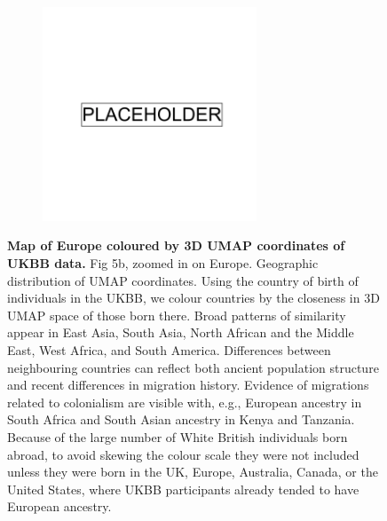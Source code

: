 \begin{figure}[ht]
    \centering
    \begin{subfigure}{\textwidth}
    \includegraphics[width=0.7\textwidth]{placeholder.png}
    \end{subfigure}
    \caption[Map of Europe coloured by 3D UMAP coordinates of UKBB data]{\textbf{Map of Europe coloured by 3D UMAP coordinates of UKBB data.} Fig 5b, zoomed in on Europe. Geographic distribution of UMAP coordinates. Using the country of birth of individuals in the UKBB, we colour countries by the closeness in 3D UMAP space of those born there. Broad patterns of similarity appear in East Asia, South Asia, North African and the Middle East, West Africa, and South America. Differences between neighbouring countries can reflect both ancient population structure and recent differences in migration history. Evidence of migrations related to colonialism are visible with, e.g., European ancestry in South Africa and South Asian ancestry in Kenya and Tanzania. Because of the large number of White British individuals born abroad, to avoid skewing the colour scale they were not included unless they were born in the UK, Europe, Australia, Canada, or the United States, where UKBB participants already tended to have European ancestry.}
    \label{fig:supp_umap_ukbb_eur}
\end{figure}

\newpage

